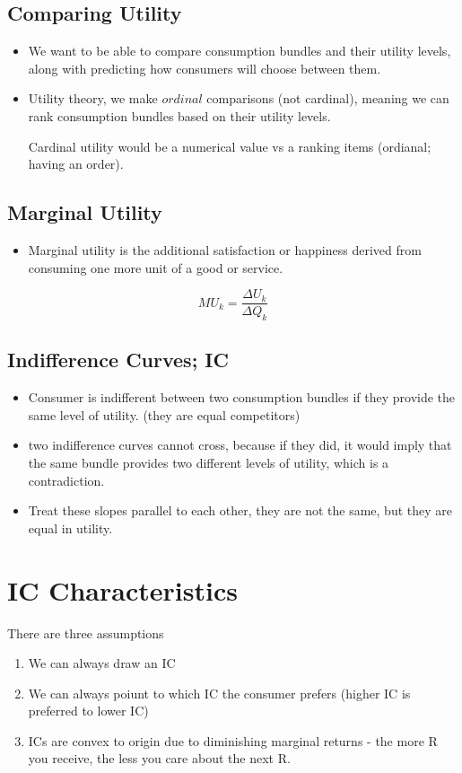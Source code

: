 \documentclass{article}
\begin{document}
\subsection{Comparing Utility}
\begin{itemize}
  \item We want to be able to compare consumption bundles and their utility levels,
    along with predicting how consumers will choose between them.
  \item Utility theory, we make $ordinal$ comparisons (not cardinal),
    meaning we can rank consumption bundles based on their utility levels.

    Cardinal utility would be a numerical value vs a ranking items (ordianal; having an order).
\end{itemize}

\subsection{Marginal Utility}
\begin{itemize}
  \item Marginal utility is the additional satisfaction or happiness
    derived from consuming one more unit of a good or service.
\end{itemize}
$$MU_k = \frac{\Delta U_k}{\Delta Q_k}$$

\subsection{Indifference Curves; IC}
\begin{itemize}
  \item Consumer is indifferent between two consumption bundles
    if they provide the same level of utility. (they are equal competitors)
  \item two indifference curves cannot cross,
    because if they did, it would imply that the same bundle provides
    two different levels of utility, which is a contradiction.
  \item Treat these slopes parallel to each other,
    they are not the same, but they are equal in utility.
\end{itemize}

\section{IC Characteristics}
   There are three assumptions
\begin{enumerate}
  \item We can always draw an IC
  \item We can always poiunt to which IC the consumer prefers
    (higher IC is preferred to lower IC)
  \item ICs are convex to origin due to diminishing marginal returns -
    the more R you receive, the less you care about the next R.
\end{enumerate}
\end{document}
